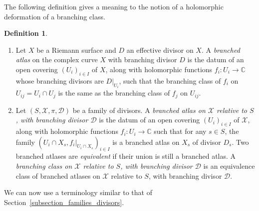 \documentclass[10pt]{amsart}
\newcommand{\skpt}{\par\smallskip}
\theoremstyle{definition}
\newtheorem{definition}{Definition}[subsection]
\theoremstyle{plain}
\begin{document}
The following definition gives a meaning to the notion of a holomorphic deformation of a branching class.

\skpt
\begin{definition}\label{definition_branched_atlas}
\begin{enumerate}
\item
Let $X$ be a Riemann surface and $D$ an effective divisor on $X$.
A \emph{branched atlas} on the complex curve $X$ with branching divisor $D$ is the datum of an open covering $(U_i)_{i \in I}$ of $X$, along with holomorphic functions $f_i: U_i \to \mathbb C$ whose branching divisors are $D|_{U_i}$, such that the branching class of $f_i$ on $U_{ij} = U_i \cap U_j$ is the same as the branching class of $f_j$ on $U_{ij}$.
\item
Let $(S, \mathcal X, \pi, \mathcal D)$ be a family of divisors.
A \emph{branched atlas on $\mathcal X$ relative to $S$, with branching divisor $\mathcal D$} is the datum of an open covering $(U_i)_{i \in I}$ of $\mathcal X$, along with holomorphic functions $f_i: U_i \to \mathbb C$ such that for any $s \in S$, the family $(U_i \cap X_s, f_i|_{U_i \cap X_s})_{i \in I}$ is a branched atlas on $X_s$ of divisor $D_s$.
Two branched atlases are \emph{equivalent} if their union is still a branched atlas.
A \emph{branching class on $\mathcal X$ relative to $S$, with branching divisor $\mathcal D$} is an equivalence class of branched atlases on $\mathcal X$ relative to $S$, with branching divisor $\mathcal D$.
\end{enumerate}
\end{definition}

\enlargethispage{-\baselineskip}%
We can now use a terminology similar to that of Section~\ref{subsection_families_divisors}.
\end{document}

